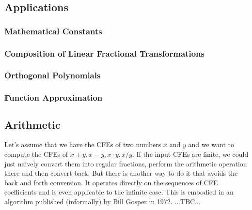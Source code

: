 


\subsection{Applications}


\subsubsection{Mathematical Constants}

\subsubsection{Composition of Linear Fractional Transformations}



\subsubsection{Orthogonal Polynomials}


\subsubsection{Function Approximation}



\subsection{Arithmetic}
Let's assume that we have the CFEs of two numbers $x$ and $y$ and we want to compute the CFEs of $x + y, x - y, x \cdot y, x / y$. If the input CFEs are finite, we could just naively convert them into regular fractions, perform the arithmetic operation there and then convert back. But there is another way to do it that avoids the back and forth conversion. It operates directly on the sequences of CFE coefficients and is even applicable to the infinite case. This is embodied in an algorithm published (informally) by Bill Gosper in 1972. ...TBC...



